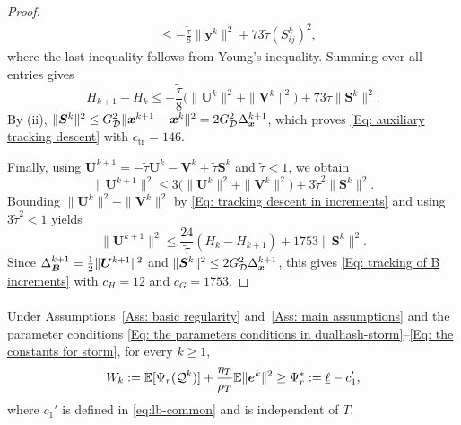 \begin{proof}
\begin{align*}
        &\le-\frac{\tilde\tau}{8}\|\bm{y}^k\|^2+73\tilde\tau (S_{ij}^k)^2,
    \end{align*}
    where the last inequality follows from Young's inequality.
    Summing over all entries gives
    \begin{equation}
        \label{Eq: tracking descent in increments}
        H_{k+1}-H_k\le-\frac{\tilde\tau}{8}\bigl(\|\bm{U}^k\|^2+\|\bm{V}^k\|^2\bigr)+73\tilde\tau\|\bm{S}^k\|^2.
    \end{equation}
    By (ii), $\|\bm{S}^k\|^2\le G_{\mathcal{D}}^2\|\bm{x}^{k+1}-\bm{x}^k\|^2=2G_{\mathcal{D}}^2\Delta_{\bm{x}}^{k+1}$, which proves \eqref{Eq: auxiliary tracking descent} with $c_{\mathrm{tr}}=146$.

    Finally, using $\bm{U}^{k+1}=-\tilde\tau\bm{U}^k-\bm{V}^k+\tilde\tau\bm{S}^k$ and $\tilde\tau<1$, we obtain
    \begin{equation*}
        \|\bm{U}^{k+1}\|^2\le3\bigl(\|\bm{U}^k\|^2+\|\bm{V}^k\|^2\bigr)+3\tilde\tau^2\|\bm{S}^k\|^2.
    \end{equation*}
    Bounding $\|\bm{U}^k\|^2+\|\bm{V}^k\|^2$ by \eqref{Eq: tracking descent in increments} and using $3\tilde\tau^2<1$ yields
    \begin{equation*}
        \|\bm{U}^{k+1}\|^2\le\frac{24}{\tilde\tau}(H_k-H_{k+1})+1753\|\bm{S}^k\|^2.
    \end{equation*}
    Since $\Delta_{\bm{B}}^{k+1}=\frac12\|\bm{U}^{k+1}\|^2$ and $\|\bm{S}^k\|^2\le2G_{\mathcal{D}}^2\Delta_{\bm{x}}^{k+1}$, this gives \eqref{Eq: tracking of B increments} with $c_H=12$ and $c_G=1753$.
\end{proof}
\endgroup

\paragraph{}
\label{app:storm-lower-bound}
\begingroup\color{blue}
\begin{lemma}
\label{Lemma: lower bound of W}
Under Assumptions~\ref{Ass: basic regularity} and~\ref{Ass: main assumptions} and the parameter conditions \eqref{Eq: the parameters conditions in dualhash-storm}--\eqref{Eq: the constants for storm}, for every $k\ge1$,
\[
W_k:=\mathbb{E}[\Psi_r(\mathcal{Q}^k)]+\frac{\eta_T}{\rho_T}\mathbb{E}\|\bm{e}^k\|^2\ge\Psi_r^*:=\underline{\ell}-c_1',
\]
where $c_1'$ is defined in \eqref{eq:lb-common} and is independent of $T$.
\end{lemma}


